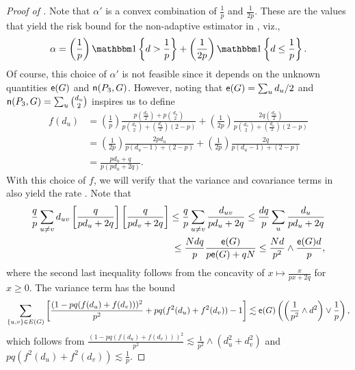\begin{proof}[Proof of ]
Note that $ \alpha' $ is a convex combination of $ \frac{1}{p} $ and $ \frac{1}{2p} $. These are the values that yield the risk bound for the non-adaptive estimator  in , viz.,
\begin{equation*}
\alpha = \left( \frac{1}{p}\right)\Indc\left\{ d > \frac{1}{p} \right\} + \left( \frac{1}{2p}\right)\Indc \left\{ d \leq \frac{1}{p} \right\}.
\end{equation*}
Of course, this choice of $ \alpha' $ is not feasible since it depends on the unknown quantities $ {\mathsf{e}}(G) $ and $ \mathsf{n}(P_3, G) $. However, noting that $ {\mathsf{e}}(G) = \sum_{u} d_{u}/2 $ and $ \mathsf{n}(P_3, G) = \sum_{u} \binom{d_{u}}{2} $ inspires us to define
\begin{align*}
f(d_{u}) & = \left( \frac{1}{p}\right)\frac{p(\frac{d_{u}}{2})+p\binom{d_{u}}{2}}{p\binom{d_{u}}{2}+(\frac{d_{u}}{2})(2-p)} + \left( \frac{1}{2p}\right)\frac{2q(\frac{d_{u}}{2})}{p\binom{d_{u}}{2}+(\frac{d_{u}}{2})(2-p)} \\
& = \left( \frac{1}{2p}\right)\frac{2pd_{u}}{p(d_{u}-1) +(2-p)} + \left( \frac{1}{2p}\right)\frac{2q}{p(d_{u}-1) +(2-p)} \\
& = \frac{pd_{u}+q}{p(pd_{u}+2q)}.
\end{align*}
With this choice of $ f $, we will verify that the variance and covariance terms in  also yield the rate . Note that
\begin{align*} 
\frac{q}{p}\sum_{u \neq v}d_{u v}\left[\frac{q}{pd_u+2q}\right]\left[\frac{q}{pd_v+2q}\right]
\leq \frac{q}{p}\sum_{u \neq v}\frac{d_{u v}}{pd_u+2q}
\leq \frac{dq}{p}\sum_{u}\frac{d_u}{pd_u+2q}
& \\ \leq \frac{Ndq}{p}\frac{{\mathsf{e}}(G)}{p{\mathsf{e}}(G)+qN} 
\leq \frac{Nd}{p^2} \wedge \frac{{\mathsf{e}}(G)d}{p},
\end{align*}
where the second last inequality follows from the concavity of $ x \mapsto \frac{x}{px + 2q} $ for $ x \geq 0 $.
The variance term has the bound
\begin{equation*}
\sum_{\{u, v\} \in E(G) } \left[\frac{(1-pq(f(d_{u}) + f(d_{v})))^2}{p^2} + pq(f^2(d_{u}) + f^2(d_{v})) - 1\right] \lesssim {\mathsf{e}}(G) \left(\left( \frac{1}{p^2} \wedge d^2 \right) \vee \frac{1}{p} \right),
\end{equation*}
which follows from $ \frac{(1-pq(f(d_{u}) + f(d_{v})))^2}{p^2}  \lesssim \frac{1}{p^2} \wedge (d^2_{u} + d^2_{v} ) $ and $ pq(f^2(d_{u}) + f^2(d_{v})) \lesssim \frac{1}{p} $.
\end{proof}

